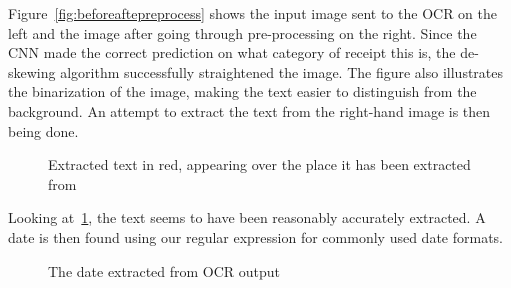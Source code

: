 Figure~\ref{fig:beforeaftepreprocess} shows the input image sent to the OCR on the left and the image after going
through pre-processing on the right.
Since the CNN made the correct prediction on what category of receipt this is, the de-skewing algorithm successfully straightened the image.
The figure also illustrates the binarization of the image, making the text easier to distinguish from the background.
An attempt to extract the text from the right-hand image is then being done.

\begin{figure}[h]
    \caption{Extracted text in red, appearing over the place it has been extracted from}
    \label{fig:ocrtextboxes}
\end{figure}

Looking at~\ref{fig:ocrtextboxes}, the text seems to have been reasonably accurately extracted.
A date is then found using our regular expression for commonly used date formats.

\begin{figure}[h]
    \caption{The date extracted from OCR output}
    \label{fig:dateocr}
\end{figure}

